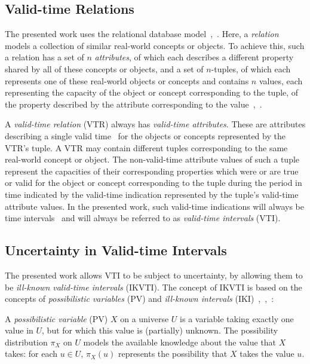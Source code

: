 \documentclass[runningheads,a4paper]{llncs}
\begin{document}
\subsection{Valid-time Relations}
The presented work uses the relational database model~\cite{Pons2012ijcis},~\cite{Galindo2001}. Here, a \emph{relation} models a collection of similar real-world concepts or objects. To achieve this, such a relation has a set of $n$ \emph{attributes}, of which each describes a different property shared by all of these concepts or objects, and a set of $n$-tuples, of which each represents one of these real-world objects or concepts and contains $n$ values, each representing the capacity of the object or concept corresponding to the tuple, of the property described by the attribute corresponding to the value~\cite{Billiet2012ipmu},~\cite{Pons2012ipmu}.

A \emph{valid-time relation} (VTR) always has \emph{valid-time attributes}. These are attributes describing a single valid time~\cite{Bohlen1998lncs} for the objects or concepts represented by the VTR's tuple. A VTR may contain different tuples corresponding to the same real-world concept or object. The non-valid-time attribute values of such a tuple represent the capacities of their corresponding properties which were or are true or valid for the object or concept corresponding to the tuple during the period in time indicated by the valid-time indication represented by the tuple's valid-time attribute values. In the presented work, such valid-time indications will always be time intervals~\cite{Bohlen1998lncs} and will always be referred to as \emph{valid-time intervals} (VTI).

\subsection{Uncertainty in Valid-time Intervals}
The presented work allows VTI to be subject to uncertainty, by allowing them to be \emph{ill-known valid-time intervals} (IKVTI). The concept of IKVTI is based on the concepts of \emph{possibilistic variables} (PV) and \emph{ill-known intervals} (IKI)~\cite{Dubois1988cma},~\cite{Pons2013ijufkbs},~\cite{Billiet2012ipmu}:

\begin{definition}
\label{def:poss-variable}
A \emph{possibilistic variable} (PV) $X$ on a universe $U$ is a variable taking exactly one value in $U$, but for which this value is (partially) unknown. The possibility distribution $\pi_X$ on $U$ models the available knowledge about the value that $X$ takes: for each $u \in U$, $\pi_X(u)$ represents the possibility that $X$ takes the value $u$.
\end{definition}
\end{document}
